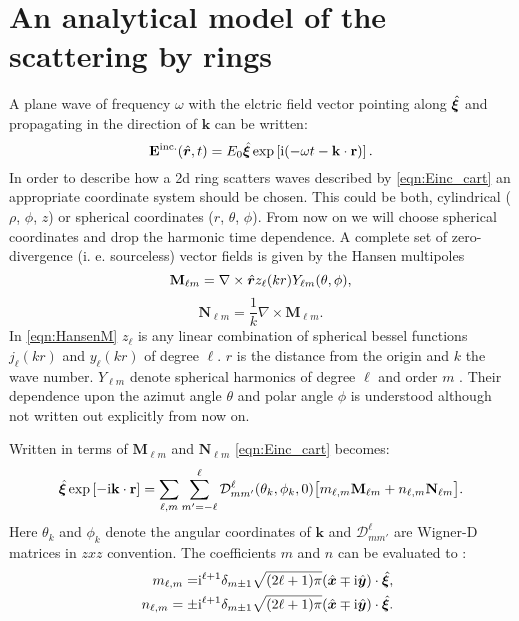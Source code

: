 \section{An analytical model of the scattering by rings}
\label{sec:analytical_ring_scattering}
A plane wave of frequency $\omega$ with the elctric field vector pointing along $\hat{\bm{\xi}}$ and propagating in the direction of $\mathbf{k}$ can be written: 
\begin{equation}
\mathbf{E}^\text{inc.} (\hat{\bm{r}}, t)= E_0 \hat{\bm{\xi}} \exp\left[\mathrm{i} (-\omega t- \mathbf{k}\cdot \mathbf{r})\right].
\label{eqn:Einc_cart}
\end{equation}
In order to describe how a 2d ring scatters waves described by \cref{eqn:Einc_cart} an appropriate coordinate system should be chosen. This could be both, cylindrical ($\rho$, $\phi$, $z$) or spherical coordinates ($r$, $\theta$, $\phi$). From now on we will choose spherical coordinates and drop the harmonic time dependence. A complete set of zero-divergence (i. e. sourceless) vector fields is given by the Hansen multipoles \Cite{Hansen1935} 
\begin{equation}
\mathbf{M}_{\ell m} = \nabla \times \hat{\bm{r}} z_\ell(kr) Y_{\ell m}(\theta, \phi),
\label{eqn:HansenM}
\end{equation}
\begin{equation}
\mathbf{N}_{\ell m} = \frac{1}{k}\nabla \times \mathbf{M}_{\ell m}.
\label{eqn:HansenN}
\end{equation}
In \cref{eqn:HansenM} $z_\ell$ is any linear combination of spherical bessel functions $j_\ell(kr)$ and $y_\ell(kr)$ \Cite{DLMF_Bessel} of degree $\ell$. $r$ is the distance from the origin and $k$ the wave number. $Y_{\ell m}$ denote spherical harmonics of degree $\ell$ and order $m$ \Cite{DLMF_SphericalHarmonics}. Their dependence upon the azimut angle $\theta$ and polar angle $\phi$ is understood although not written out explicitly from now on.

Written in terms of $\mathbf{M}_{\ell m}$ and $\mathbf{N}_{\ell m}$ \cref{eqn:Einc_cart} becomes:
\begin{equation}
\hat{\bm{\xi}} \exp\left[-\mathrm{i}  \mathbf{k}\cdot \mathbf{r}\right] =\sum_{\ell,m} \sum_{m'=-\ell}^\ell\mathcal{D}_{m m'}^\ell (\theta_k, \phi_k,0)\big[
m_{\ell, m} \mathbf{M}_{\ell m} +n_{\ell,m} \mathbf{N}_{\ell m}\big].
\end{equation}
Here $\theta_k$ and $\phi_k$ denote the angular coordinates of $\mathbf{k}$ and $\mathcal{D}_{m m'}^\ell$ are Wigner-D matrices in $zxz$ convention. The coefficients $m$ and $n$ can be evaluated to \Cite{Kristensson2014}:
\begin{align}
&& m_{\ell,m} = &\mathrm{i}^{\ell+1} \delta_{m\pm 1}\sqrt{(2\ell+1)\pi} 
(\hat{\bm{x}}\mp\mathrm{i} \hat{\bm{y}})\cdot \hat{\bm{\xi}},\\
&& n_{\ell,m} = \pm&\mathrm{i}^{\ell+1} \delta_{m\pm 1}\sqrt{(2\ell+1)\pi} 
(\hat{\bm{x}}\mp\mathrm{i} \hat{\bm{y}})\cdot \hat{\bm{\xi}}.
\end{align}


